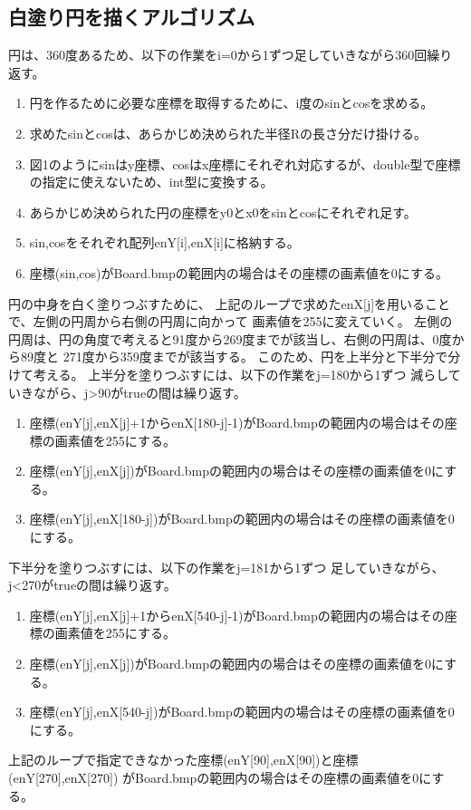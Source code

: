 \documentclass{jsarticle}
\begin{document}
\subsection{白塗り円を描くアルゴリズム}
円は、360度あるため、以下の作業をi=0から1ずつ足していきながら360回繰り返す。
\begin{enumerate}
  \item 円を作るために必要な座標を取得するために、i度のsinとcosを求める。
  \item 求めたsinとcosは、あらかじめ決められた半径Rの長さ分だけ掛ける。
  \item 図1のようにsinはy座標、cosはx座標にそれぞれ対応するが、double型で座標の指定に使えないため、int型に変換する。
  \item あらかじめ決められた円の座標をy0とx0をsinとcosにそれぞれ足す。
  \item sin,cosをそれぞれ配列enY[i],enX[i]に格納する。
  \item 座標(sin,cos)がBoard.bmpの範囲内の場合はその座標の画素値を0にする。
\end{enumerate}
円の中身を白く塗りつぶすために、
上記のループで求めたenX[j]を用いることで、左側の円周から右側の円周に向かって
画素値を255に変えていく。
左側の円周は、円の角度で考えると91度から269度までが該当し、右側の円周は、0度から89度と
271度から359度までが該当する。
このため、円を上半分と下半分で分けて考える。
上半分を塗りつぶすには、以下の作業をj=180から1ずつ
減らしていきながら、j\textgreater90がtrueの間は繰り返す。
\begin{enumerate}
  \item 座標(enY[j],enX[j]+1からenX[180-j]-1)がBoard.bmpの範囲内の場合はその座標の画素値を255にする。
  \item 座標(enY[j],enX[j])がBoard.bmpの範囲内の場合はその座標の画素値を0にする。
  \item 座標(enY[j],enX[180-j])がBoard.bmpの範囲内の場合はその座標の画素値を0にする。
\end{enumerate}
下半分を塗りつぶすには、以下の作業をj=181から1ずつ
足していきながら、j\textless270がtrueの間は繰り返す。
\begin{enumerate}
  \item 座標(enY[j],enX[j]+1からenX[540-j]-1)がBoard.bmpの範囲内の場合はその座標の画素値を255にする。
  \item 座標(enY[j],enX[j])がBoard.bmpの範囲内の場合はその座標の画素値を0にする。
  \item 座標(enY[j],enX[540-j])がBoard.bmpの範囲内の場合はその座標の画素値を0にする。
\end{enumerate}
上記のループで指定できなかった座標(enY[90],enX[90])と座標(enY[270],enX[270])
がBoard.bmpの範囲内の場合はその座標の画素値を0にする。
\end{document}
